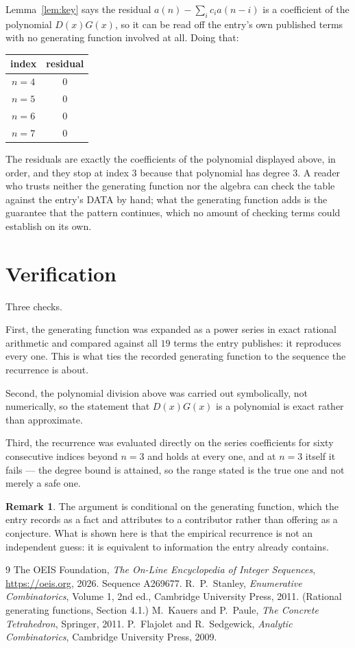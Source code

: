 \documentclass[11pt,a4paper]{article}
\theoremstyle{plain}
\theoremstyle{definition}
\newtheorem{remark}[theorem]{Remark}
\begin{document}
Lemma~\ref{lem:key} says the residual $a(n)-\sum_ic_ia(n-i)$ is a coefficient of the
polynomial $D(x)G(x)$, so it can be read off the entry's own published terms with no
generating function involved at all. Doing that:
\begin{center}
\begin{tabular}{cc}
index & residual \\ \hline
$n=4$ & $0$ \\
$n=5$ & $0$ \\
$n=6$ & $0$ \\
$n=7$ & $0$
\end{tabular}
\end{center}
The residuals are exactly the coefficients of the polynomial displayed above, in order, and
they stop at index $3$ because that polynomial has degree $3$. A reader who trusts
neither the generating function nor the algebra can check the table against the entry's DATA
by hand; what the generating function adds is the guarantee that the pattern continues, which
no amount of checking terms could establish on its own.

\section{Verification}

Three checks.

First, the generating function was expanded as a power series in exact rational arithmetic and
compared against all $19$ terms the entry publishes: it reproduces every one. This is
what ties the recorded generating function to the sequence the recurrence is about.

Second, the polynomial division above was carried out symbolically, not numerically, so the
statement that $D(x)G(x)$ is a polynomial is exact rather than approximate.

Third, the recurrence was evaluated directly on the series coefficients for sixty consecutive
indices beyond $n=3$ and holds at every one, and at $n=3$ itself it fails --- the
degree bound is attained, so the range stated is the true one and not merely a safe one.

\begin{remark}
The argument is conditional on the generating function, which the entry records as a fact and
attributes to a contributor rather than offering as a conjecture. What is shown here is that
the empirical recurrence is not an independent guess: it is equivalent to information the
entry already contains.
\end{remark}

\begin{thebibliography}{9}
 The OEIS Foundation, \emph{The On-Line Encyclopedia of Integer
Sequences}, \url{https://oeis.org}, 2026. Sequence A269677.
 R.~P.~Stanley, \emph{Enumerative Combinatorics}, Volume 1, 2nd ed.,
Cambridge University Press, 2011. (Rational generating functions, Section 4.1.)
 M.~Kauers and P.~Paule, \emph{The Concrete Tetrahedron}, Springer, 2011.
 P.~Flajolet and R.~Sedgewick, \emph{Analytic Combinatorics}, Cambridge
University Press, 2009.
\end{thebibliography}
\end{document}
